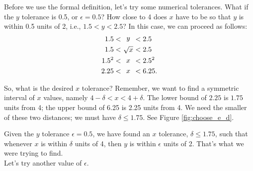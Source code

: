 {Before we use the formal definition, let's try some numerical tolerances.  What if the $y$ tolerance is 0.5, or $\epsilon =0.5$?  How close to 4 does $x$ have to be so that $y$ is within 0.5 units of 2, i.e., $1.5 < y < 2.5$?  In this case, we can proceed as follows:
\begin{align*}
1.5 &< \parbox{15pt}{\centering $y$} < 2.5 \\
1.5 &< \parbox{15pt}{\centering $\sqrt{x}$} < 2.5\\
1.5^2 &< \parbox{15pt}{\centering $x$} < 2.5^2\\
2.25 &< \parbox{15pt}{\centering $x$} < 6.25.
\end{align*}

So, what is the desired $x$ tolerance?  Remember, we want to find a symmetric interval of $x$ values, namely
$4 - \delta < x < 4 + \delta$.  The lower bound of $2.25$ is $1.75$ units from 4; the upper bound of 6.25 is 2.25 units from 4. We need the smaller of these two distances; we must have $\delta \leq 1.75$. See Figure \ref{fig:choose_e_d}.\\


		

Given the $y$ tolerance $\epsilon =0.5$, we have found an $x$ tolerance, $\delta \leq 1.75$, such that whenever $x$ is within $\delta$ units of 4, then $y$ is within $\epsilon$ units of 2.  That's what we were trying to find.\\
  
Let's try another value of $\epsilon$.\\

}
